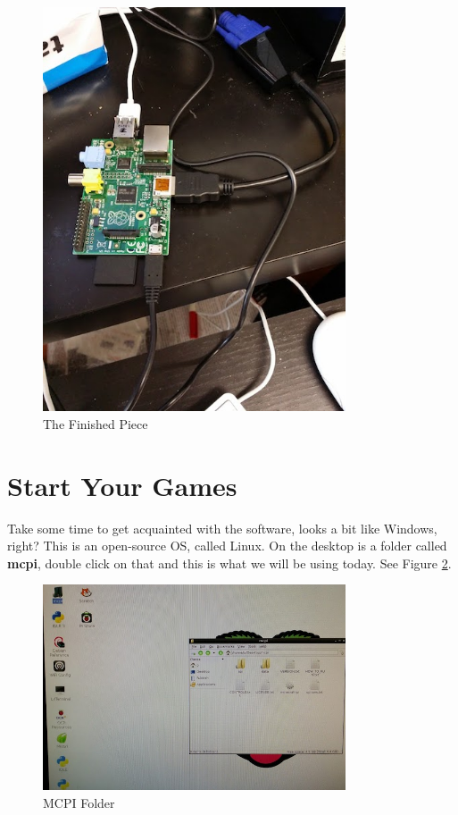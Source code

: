 \documentclass[]{paper}
\begin{document}
\begin{figure}[H]
    \centering
    \includegraphics[width=0.8\textwidth]{figures/rpi.jpg}
    \caption{The Finished Piece}
    \label{fig:rpi}
\end{figure}

\section{Start Your Games}
Take some time to get acquainted with the software, looks a bit like Windows, right? This is an open-source OS, called Linux. On the desktop is a folder called \textbf{mcpi}, double click on that and this is what we will be using today. See Figure \ref{fig:mcpi}.

\begin{figure}[H]
    \centering
    \includegraphics[width=0.8\textwidth]{figures/folder.jpg}
    \caption{MCPI Folder}
    \label{fig:mcpi}
\end{figure}
\end{document}
